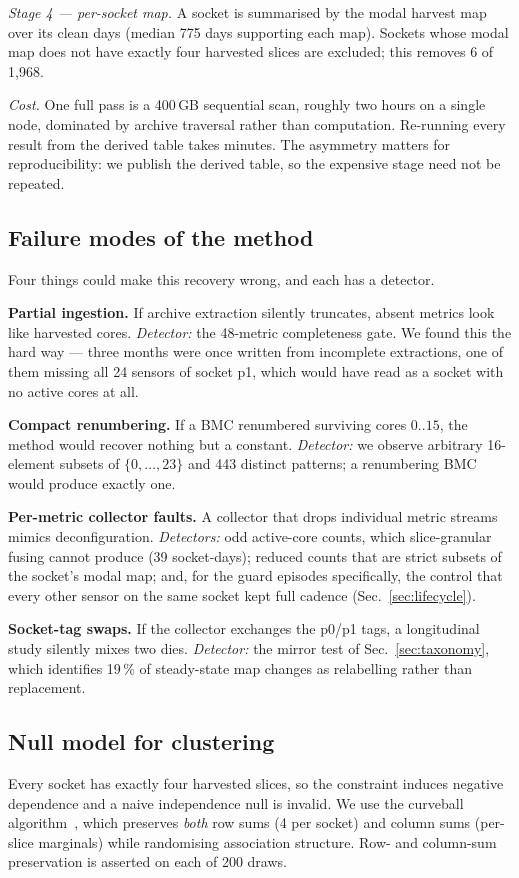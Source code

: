 \documentclass[10pt,conference]{IEEEtran}
\begin{document}
\emph{Stage 4 --- per-socket map.} A socket is summarised by the modal harvest map over its clean
days (median 775 days supporting each map). Sockets whose modal map does not have exactly four
harvested slices are excluded; this removes 6 of 1{,}968.

\emph{Cost.} One full pass is a 400\,GB sequential scan, roughly two hours on a single node,
dominated by archive traversal rather than computation. Re-running every result from the derived
table takes minutes. The asymmetry matters for reproducibility: we publish the derived table, so
the expensive stage need not be repeated.

\subsection{Failure modes of the method}
\label{sec:failure}
Four things could make this recovery wrong, and each has a detector.

\textbf{Partial ingestion.} If archive extraction silently truncates, absent metrics look like
harvested cores. \emph{Detector:} the 48-metric completeness gate. We found this the hard way ---
three months were once written from incomplete extractions, one of them missing all 24 sensors of
socket p1, which would have read as a socket with no active cores at all.

\textbf{Compact renumbering.} If a BMC renumbered surviving cores $0..15$, the method would
recover nothing but a constant. \emph{Detector:} we observe arbitrary 16-element subsets of
$\{0,\dots,23\}$ and 443 distinct patterns; a renumbering BMC would produce exactly one.

\textbf{Per-metric collector faults.} A collector that drops individual metric streams mimics
deconfiguration. \emph{Detectors:} odd active-core counts, which slice-granular fusing cannot
produce (39 socket-days); reduced counts that are strict subsets of the socket's modal map; and,
for the guard episodes specifically, the control that every other sensor on the same socket kept
full cadence (Sec.~\ref{sec:lifecycle}).

\textbf{Socket-tag swaps.} If the collector exchanges the p0/p1 tags, a longitudinal study
silently mixes two dies. \emph{Detector:} the mirror test of Sec.~\ref{sec:taxonomy}, which
identifies 19\,\% of steady-state map changes as relabelling rather than replacement.

\subsection{Null model for clustering}
Every socket has exactly four harvested slices, so the constraint induces negative dependence and a
naive independence null is invalid. We use the curveball algorithm~\cite{strona2014curveball},
which preserves \emph{both} row sums (4 per socket) and column sums (per-slice marginals) while
randomising association structure. Row- and column-sum preservation is asserted on each of 200 draws.
\end{document}

